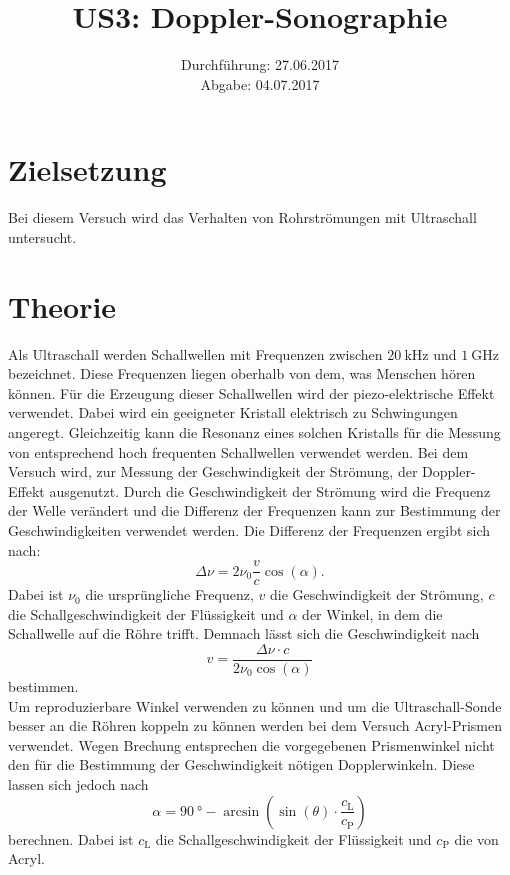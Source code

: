 \documentclass[
  bibliography=totoc,     %
  captions=tableheading,  %
  titlepage=firstiscover, %
]{scrartcl}
\title{US3: Doppler-Sonographie}
\author{
  Simon Schulte
  \texorpdfstring{
    \\
    \href{mailto:simon.schulte@udo.edu}{simon.schulte@udo.edu}
  }{}
  \texorpdfstring{\and}{, }
  Tim Sedlaczek
  \texorpdfstring{
    \\
    \href{mailto:tim.sedlaczek@udo.edu}{tim.sedlaczek@udo.edu}
  }{}
}
\date{Durchführung: 27.06.2017\\
      Abgabe: 04.07.2017}
\begin{document}
\maketitle
\thispagestyle{empty}
\tableofcontents
\newpage
\setcounter{page}{1}
\section{Zielsetzung}
\label{sec:zielsetzung}
Bei diesem Versuch wird das Verhalten von Rohrströmungen mit Ultraschall untersucht.
\section{Theorie}
\label{sec:theorie}
Als Ultraschall werden Schallwellen mit Frequenzen zwischen $\SI{20}{\kilo\hertz}$
und $\SI{1}{\giga\hertz}$ bezeichnet. Diese Frequenzen liegen oberhalb von dem,
was Menschen hören können. Für die Erzeugung dieser Schallwellen wird der
piezo-elektrische Effekt verwendet. Dabei wird ein geeigneter Kristall
elektrisch zu Schwingungen angeregt. Gleichzeitig kann die Resonanz eines solchen
Kristalls für die Messung von entsprechend hoch frequenten Schallwellen verwendet
werden. Bei dem Versuch wird, zur Messung der Geschwindigkeit der Strömung,
der Doppler-Effekt ausgenutzt. Durch die Geschwindigkeit der Strömung wird die
Frequenz der Welle verändert und die Differenz der Frequenzen kann zur Bestimmung
der Geschwindigkeiten verwendet werden.
Die Differenz der Frequenzen ergibt sich nach:
\begin{equation}
  \Delta \nu = 2 \nu_{0} \frac{v}{c} \cos \left( \alpha \right).
  \label{eqn:freqdiff}
\end{equation}
Dabei ist $\nu_{0}$ die ursprüngliche Frequenz, $v$ die Geschwindigkeit der
Strömung, $c$ die Schallgeschwindigkeit der Flüssigkeit und $\alpha$ der Winkel,
in dem die Schallwelle auf die Röhre trifft.
Demnach lässt sich die Geschwindigkeit nach
\begin{equation}
  v = \frac{\Delta \nu \cdot c}{2 \nu_{0} \cos \left( \alpha \right)}
  \label{eqn:geschw}
\end{equation}
bestimmen.\\

\noindent
Um reproduzierbare Winkel verwenden zu können und um die Ultraschall-Sonde besser
an die Röhren koppeln zu können werden bei dem Versuch Acryl-Prismen verwendet.
Wegen Brechung entsprechen die vorgegebenen Prismenwinkel nicht den für die
Bestimmung der Geschwindigkeit nötigen Dopplerwinkeln. Diese lassen sich jedoch
nach
\begin{equation}
  \alpha = \SI{90}{\degree} - \arcsin \left( \sin \left( \theta \right) \cdot \frac{c_\mathup{L}}{c_\mathup{P}} \right)
  \label{eqn:dopplerwinkel}
\end{equation}
berechnen. Dabei ist $c_\mathup{L}$ die Schallgeschwindigkeit der Flüssigkeit und
$c_\mathup{P}$ die von Acryl.
\clearpage
\end{document}
